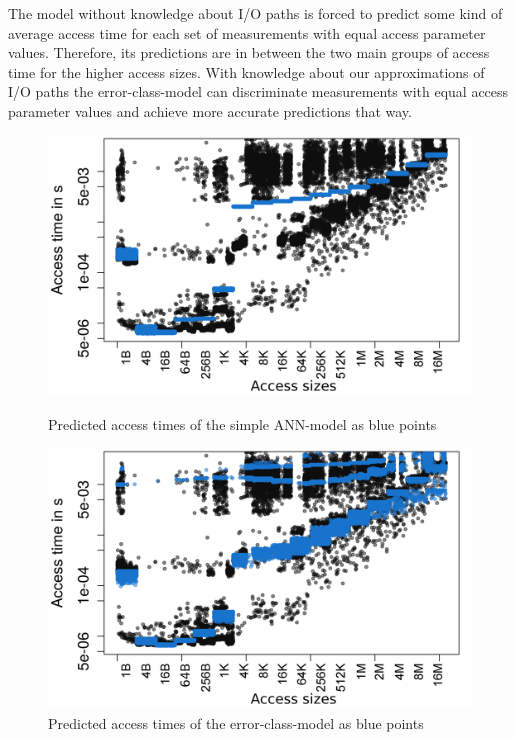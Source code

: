 \documentclass{superfri}
\begin{document}
	The model without knowledge about I/O paths is forced to predict some kind of average access time for each set of measurements with equal access parameter values. Therefore, its predictions are in between the two main groups of access time for the higher access sizes.
	With knowledge about our approximations of I/O paths the error-class-model can discriminate measurements with equal access parameter values and achieve more accurate predictions that way.
	\begin{figure}[h]
		\centering
		\begin{minipage}[b]{0.47\textwidth}
			\includegraphics[width=\textwidth]{src/plot_onlyPred_tuple1_Duration_rnd.png}
			\caption{Predicted access times of the simple ANN-model as blue points}
			\label{pred_tuple1}
		\end{minipage}
		\hfill
		\begin{minipage}[b]{0.47\textwidth}
			\includegraphics[width=\textwidth]{src/plot_onlyPred_tuple1_with_error_class_from_linreg_Duration_rnd.png}
			\caption{Predicted access times of the error-class-model as blue points}
			\label{pred_error}
		\end{minipage}
	\end{figure}
	
\end{document}
